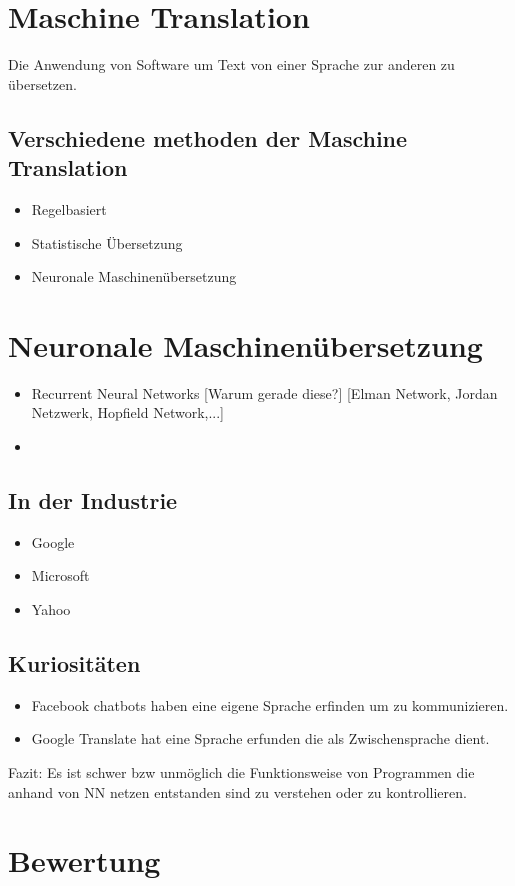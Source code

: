 \documentclass{thesisclass}
\begin{document}
\section{Maschine Translation}
Die Anwendung von Software um Text von einer Sprache zur anderen zu übersetzen.
\subsection{Verschiedene methoden der Maschine Translation}
\begin{itemize}
	\item Regelbasiert
	\item Statistische Übersetzung
	\item Neuronale Maschinenübersetzung
\end{itemize}
\newpage
\section{Neuronale Maschinenübersetzung}
\begin{itemize}
	\item Recurrent Neural Networks
		[Warum gerade diese?]
		[Elman Network, Jordan Netzwerk, Hopfield Network,...]
	\item 
\end{itemize}
\subsection{In der Industrie}
\begin{itemize}
	\item Google
	\item Microsoft
	\item Yahoo
\end{itemize}
\subsection{Kuriositäten}
\begin{itemize}
	\item Facebook chatbots haben eine eigene Sprache erfinden um zu kommunizieren.
	\item Google Translate hat eine Sprache erfunden die als Zwischensprache dient.
\end{itemize}
Fazit: Es ist schwer bzw unmöglich die Funktionsweise von Programmen die anhand von NN netzen entstanden sind zu verstehen oder zu kontrollieren.
\section{Bewertung}
\end{document}
